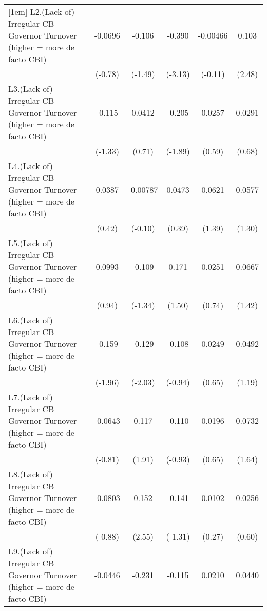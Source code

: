{\begin{tabular}{l*{5}{c}}
[1em]
L2.(Lack of) Irregular CB Governor Turnover (higher = more de facto CBI)&  -0.0696         &   -0.106         &   -0.390\sym{**} & -0.00466         &    0.103\sym{*}  \\
                &  (-0.78)         &  (-1.49)         &  (-3.13)         &  (-0.11)         &   (2.48)         \\
[1em]
L3.(Lack of) Irregular CB Governor Turnover (higher = more de facto CBI)&   -0.115         &   0.0412         &   -0.205         &   0.0257         &   0.0291         \\
                &  (-1.33)         &   (0.71)         &  (-1.89)         &   (0.59)         &   (0.68)         \\
[1em]
L4.(Lack of) Irregular CB Governor Turnover (higher = more de facto CBI)&   0.0387         & -0.00787         &   0.0473         &   0.0621         &   0.0577         \\
                &   (0.42)         &  (-0.10)         &   (0.39)         &   (1.39)         &   (1.30)         \\
[1em]
L5.(Lack of) Irregular CB Governor Turnover (higher = more de facto CBI)&   0.0993         &   -0.109         &    0.171         &   0.0251         &   0.0667         \\
                &   (0.94)         &  (-1.34)         &   (1.50)         &   (0.74)         &   (1.42)         \\
[1em]
L6.(Lack of) Irregular CB Governor Turnover (higher = more de facto CBI)&   -0.159         &   -0.129\sym{*}  &   -0.108         &   0.0249         &   0.0492         \\
                &  (-1.96)         &  (-2.03)         &  (-0.94)         &   (0.65)         &   (1.19)         \\
[1em]
L7.(Lack of) Irregular CB Governor Turnover (higher = more de facto CBI)&  -0.0643         &    0.117         &   -0.110         &   0.0196         &   0.0732         \\
                &  (-0.81)         &   (1.91)         &  (-0.93)         &   (0.65)         &   (1.64)         \\
[1em]
L8.(Lack of) Irregular CB Governor Turnover (higher = more de facto CBI)&  -0.0803         &    0.152\sym{*}  &   -0.141         &   0.0102         &   0.0256         \\
                &  (-0.88)         &   (2.55)         &  (-1.31)         &   (0.27)         &   (0.60)         \\
[1em]
L9.(Lack of) Irregular CB Governor Turnover (higher = more de facto CBI)&  -0.0446         &   -0.231\sym{*}  &   -0.115         &   0.0210         &   0.0440         \\

\end{tabular}}
